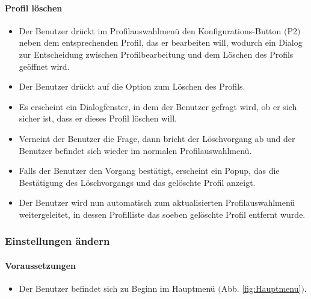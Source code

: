 \paragraph{Profil löschen}
\begin{itemize}
	\item Der Benutzer drückt im Profilauswahlmenü den Konfigurations-Button $($P2$)$ neben dem entsprechenden Profil, das er bearbeiten will, wodurch ein Dialog zur Entscheidung zwischen Profilbearbeitung und dem Löschen des Profils geöffnet wird.
	\item Der Benutzer drückt auf die Option zum Löschen des Profils.
	\item Es erscheint ein Dialogfenster, in dem der Benutzer gefragt wird, ob er sich sicher ist, dass er dieses Profil löschen will.
	\item Verneint der Benutzer die Frage, dann bricht der Löschvorgang ab und der Benutzer befindet sich wieder im normalen Profilauswahlmenü.
	\item Falls der Benutzer den Vorgang bestätigt, erscheint ein Popup, das die Bestätigung des Löschvorgangs und das gelöschte Profil anzeigt.
	\item Der Benutzer wird nun automatisch zum aktualisierten Profilauswahlmenü weitergeleitet, in dessen Profilliste das soeben gelöschte Profil entfernt wurde.
\end{itemize}

\subsubsection{Einstellungen ändern}
\paragraph{Voraussetzungen}
\begin{itemize}
	\item Der Benutzer befindet sich zu Beginn im Hauptmenü $($Abb. \ref{fig:Hauptmenu}$)$.
\end{itemize}
